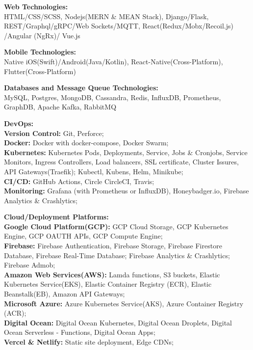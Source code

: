\documentclass{article}
\begin{document}
\noindent \normalsize \textbf{Web Technologies:} \\
\noindent \normalsize HTML/CSS/SCSS, Nodejs(MERN \& MEAN Stack), Django/Flask, REST/Graphql/gRPC/Web Sockets/MQTT, React(Redux/Mobx/Recoil.js) /Angular (NgRx)/ Vue.js
\vspace{3pt}

\noindent \normalsize \textbf{Mobile Technologies:} \\
\noindent \normalsize Native iOS(Swift)/Android(Java/Kotlin), React-Native(Cross-Platform), Flutter(Cross-Platform)
\vspace{3pt}

\noindent \normalsize \textbf{Databases and Message Queue Technologies:} \\
\noindent \normalsize MySQL, Postgres, MongoDB, Cassandra, Redis, InfluxDB, Prometheus, GraphDB, Apache Kafka, RabbitMQ
\vspace{3pt}

\noindent \normalsize \textbf{DevOps:} \\
\textbf{Version Control:} Git, Perforce;\\
\textbf{Docker:} Docker with docker-compose, Docker Swarm;\\
\textbf{Kubernetes:} Kubernetes Pods, Deployments, Service, Jobs \& Cronjobs, Service Monitors, Ingress Controllers, Load balancers, SSL certificate, Cluster Issures, API Gateways(Traefik); Kubectl, Kubens, Helm, Minikube;\\
\textbf{CI/CD:} GitHub Actions, Circle CircleCI, Travis;\\
\textbf{Monitoring:} Grafana (with Prometheus or InfluxDB), Honeybadger.io,  Firebase Analytics \& Crashlytics;
\vspace{3pt}

\noindent \normalsize \textbf{Cloud/Deployment Platforms:}\\
\textbf{Google Cloud Platform(GCP):} GCP Cloud Storage, GCP Kubernetes Engine, GCP OAUTH APIs, GCP Compute Engine;\\
\textbf{Firebase:} Firebase Authentication, Firebase Storage, Firebase Firestore Database, Firebase Real-Time Database; Firebase Analytics \& Crashlytics; Firebase Admob;\\
\textbf{Amazon Web Services(AWS):} Lamda functions, S3 buckets, Elastic Kubernetes Service(EKS), Elastic Container Registry (ECR), Elastic Beanstalk(EB), Amazon API Gateways;\\
\textbf{Microsoft Azure:} Azure Kubernetes Service(AKS), Azure Container Registry (ACR);\\
\textbf{Digital Ocean:} Digital Ocean Kubernetes, Digital Ocean Droplets, Digital Ocean Serverless - Functions, Digital Ocean Apps;\\
\textbf{Vercel \& Netlify:} Static site deployment, Edge CDNs;  
\vspace{3pt}
\end{document}
